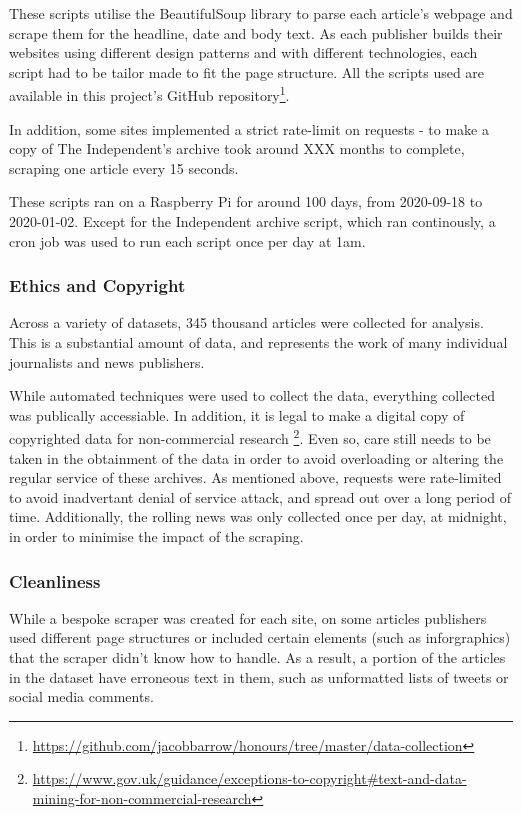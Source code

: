 These scripts utilise the BeautifulSoup library to parse each article's webpage and scrape them for the headline, date and body text. As each publisher builds their websites using different design patterns and with different technologies, each script had to be tailor made to fit the page structure. All the scripts used are available in this project's GitHub repository\footnote{\url{https://github.com/jacobbarrow/honours/tree/master/data-collection}}.

In addition, some sites implemented a strict rate-limit on requests - to make a copy of The Independent's archive took around XXX months to complete, scraping one article every 15 seconds. 

These scripts ran on a Raspberry Pi for around 100 days, from 2020-09-18 to 2020-01-02. Except for the Independent archive script, which ran continously, a cron job was used to run each script once per day at 1am.

\subsubsection{Ethics and Copyright}
Across a variety of datasets, 345 thousand articles were collected for analysis. This is a substantial amount of data, and represents the work of many individual journalists and news publishers. 

While automated techniques were used to collect the data, everything collected was publically accessiable. In addition, it is legal to make a digital copy of copyrighted data for non-commercial research \footnote{\url{https://www.gov.uk/guidance/exceptions-to-copyright#text-and-data-mining-for-non-commercial-research}}. Even so, care still needs to be taken in the obtainment of the data in order to avoid overloading or altering the regular service of these archives. As mentioned above, requests were rate-limited to avoid inadvertant denial of service attack, and spread out over a long period of time. Additionally, the rolling news was only collected once per day, at midnight, in order to minimise the impact of the scraping.

\subsubsection{Cleanliness}
While a bespoke scraper was created for each site, on some articles publishers used different page structures or included certain elements (such as inforgraphics) that the scraper didn't know how to handle. As a result, a portion of the articles in the dataset have erroneous text in them, such as unformatted lists of tweets or social media comments.

